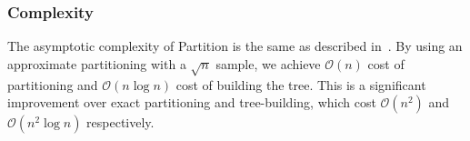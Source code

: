 



\subsubsection {Complexity}
\label{subsubsec:methods:clustering:clustering:complexity}

The asymptotic complexity of Partition is the same as described in~\cite{ishaq2019clustered}.
By using an approximate partitioning with a $\sqrt{n}$ sample, we achieve $\mathcal{O}(n)$ cost of partitioning and $\mathcal{O}(n \log n)$ cost of building the tree.
This is a significant improvement over exact partitioning and tree-building, which cost $\mathcal{O}(n^2)$ and $\mathcal{O}(n^2 \log n)$ respectively.


